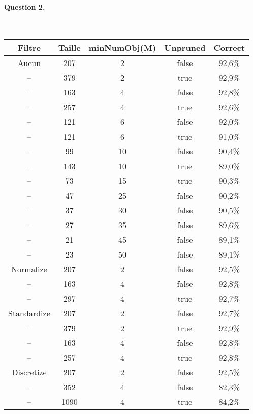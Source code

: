 \documentclass[a4paper,11pt]{article}
\begin{document}
\paragraph{Question 2.} ~\\
\begin{center}
	\begin{tabular}{|c|c|c|c|c|}
		\hline
		\textbf{Filtre} 	& \textbf{Taille} 	& \textbf{minNumObj(M)} 	& \textbf{Unpruned} 	& \textbf{Correct} \\
		\hline
		\hline
		Aucun		& 207		& 2		& false			& 92,6\% \\
		-- 		& 379		& 2		& true			& 92,9\% \\
\rowcolor{green} -- 		& 163		& 4		& false			& 92,8\% \\
		-- 		& 257		& 4		& true			& 92,6\% \\
		-- 		& 121		& 6		& false			& 92,0\% \\
		-- 		& 121		& 6		& true			& 91,0\% \\
		-- 		& 99		& 10		& false			& 90,4\% \\
		-- 		& 143		& 10		& true			& 89,0\% \\
		-- 		& 73		& 15		& true			& 90,3\% \\
		--		& 47		& 25		& false			& 90,2\% \\
		--		& 37		& 30		& false			& 90,5\% \\
		--		& 27		& 35		& false			& 89,6\% \\
		--		& 21		& 45		& false			& 89,1\% \\
		--		& 23		& 50		& false			& 89,1\% \\
		\hline
		\hline
		Normalize 		& 207		& 2		& false		& 92,5\% \\
		-- 			& 163		& 4		& false		& 92,8\% \\
		-- 			& 297		& 4		& true		& 92,7\% \\
		\hline
		\hline
		Standardize 		& 207		& 2		& false		& 92,7\% \\
		-- 			& 379		& 2		& true		& 92,9\% \\
		-- 			& 163		& 4		& false		& 92,8\% \\
		-- 			& 257		& 4		& true		& 92,8\% \\
		\hline
		\hline
		Discretize 		& 207		& 2		& false		& 92,5\% \\
		-- 			& 352		& 4		& false		& 82,3\% \\
		-- 			& 1090		& 4		& true		& 84,2\% \\
		\hline
	\end{tabular}
\end{center}
\end{document}
